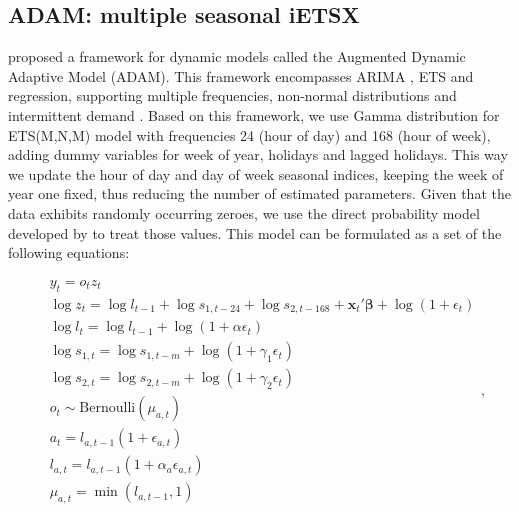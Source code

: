 \documentclass[]{elsarticle} %
\begin{document}
\hypertarget{adam-multiple-seasonal-ietsx}{%
\subsection{ADAM: multiple seasonal iETSX}\label{adam-multiple-seasonal-ietsx}}

\citet{SvetunkovAdam2021} proposed a framework for dynamic models called the Augmented Dynamic Adaptive Model (ADAM). This framework encompasses ARIMA \citep{Box1976}, ETS \citep{Hyndman2008b} and regression, supporting multiple frequencies, non-normal distributions and intermittent demand \citep{Svetunkov2019a}. Based on this framework, we use Gamma distribution for ETS(M,N,M) model with frequencies 24 (hour of day) and 168 (hour of week), adding dummy variables for week of year, holidays and lagged holidays. This way we update the hour of day and day of week seasonal indices, keeping the week of year one fixed, thus reducing the number of estimated parameters. Given that the data exhibits randomly occurring zeroes, we use the direct probability model developed by \citet{Svetunkov2019a} to treat those values. This model can be formulated as a set of the following equations:

\begin{equation}
    \begin{aligned}
      & y_t = o_t z_t \\
        & \log z_t = \log l_{t-1} + \log s_{1,t-24} + \log s_{2,t-168} + \mathbf{x}_t' \boldsymbol{\beta} + \log \left(1 + \epsilon_{t} \right) \\
        & \log l_{t} = \log l_{t-1} + \log( 1  + \alpha \epsilon_{t}) \\ 
        & \log s_{1,t} = \log s_{1,t-m} + \log( 1  + \gamma_1 \epsilon_{t}) \\
        & \log s_{2,t} = \log s_{2,t-m} + \log( 1  + \gamma_2 \epsilon_{t}) \\
        & o_t \sim \text{Bernoulli} \left(\mu_{a,t} \right) \\
        & a_t = l_{a,t-1} \left(1 + \epsilon_{a,t} \right) \\
        & l_{a,t} = l_{a,t-1}( 1  + \alpha_{a} \epsilon_{a,t}) \\
        & \mu_{a,t} = \min(l_{a,t-1}, 1)
    \end{aligned} ,
    \label{eq:ADAMModel}
\end{equation}
\end{document}
